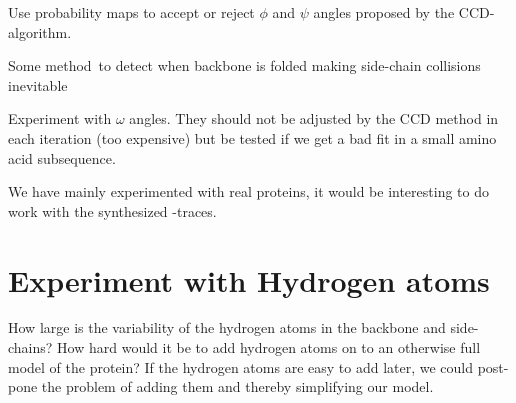 Use probability maps to accept or reject $\phi$ and $\psi$ angles proposed by the CCD-algorithm.

Some method\texttrademark\ to detect when backbone is folded making side-chain collisions inevitable

Experiment with $\omega$ angles. They should not be adjusted by the CCD method in each iteration (too expensive) but be tested if we get a bad fit in a small amino acid subsequence.

We have mainly experimented with real proteins, it would be interesting to do work with the synthesized \Ca-traces.

\section{Experiment with Hydrogen atoms}
How large is the variability of the hydrogen atoms in the backbone and
side-chains? How hard would it be to add hydrogen atoms on to an
otherwise full model of the protein? If the hydrogen atoms are easy to
add later, we could post-pone the problem of adding them and thereby
simplifying our model.


